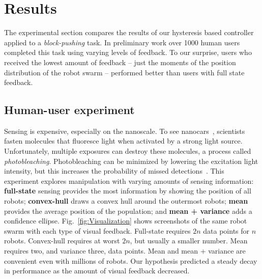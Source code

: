 
\section{Results}\label{sec:expResults}

The experimental section compares the results of our hysteresis based controller applied to a \emph{block-pushing} task.  In preliminary work over 1000 human users completed this task using varying levels of feedback. To our surprise, users who received the lowest amount of feedback -- just the moments of the position distribution of the robot swarm -- performed better than users with full state feedback.





\subsection{Human-user experiment}

Sensing is expensive, especially on the nanoscale. To see nanocars~\cite{Chiang2011}, scientists fasten molecules that fluoresce light when activated by a strong light source. Unfortunately, multiple exposures can destroy these molecules, a process called \emph{photobleaching}. Photobleaching can be minimized by lowering the excitation light intensity, but this increases the probability of missed detections~\cite{Cazes2001}.  This experiment explores manipulation with varying amounts of sensing information: {\bf full-state} sensing provides the most information by showing the position of all robots; {\bf convex-hull} draws a convex hull around the outermost robots; {\bf mean} provides the average position of the population; and {\bf mean + variance} adds a confidence ellipse. Fig.~\ref{fig:Visualization} shows screenshots of the same robot swarm with each type of visual feedback. Full-state requires $2n$ data points for $n$ robots. Convex-hull requires at worst $2n$, but usually a smaller number.  Mean requires two, and variance three, data points.  Mean and mean + variance are convenient even with millions of robots. Our hypothesis predicted a steady decay in performance as the amount of visual feedback decreased.

